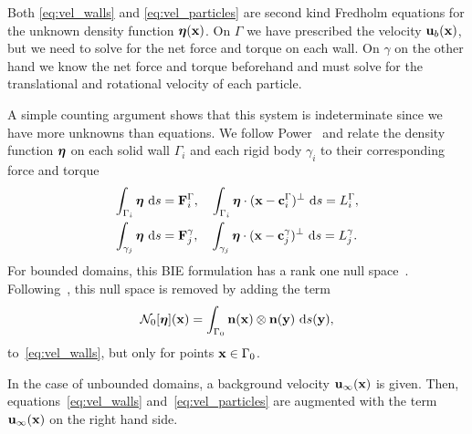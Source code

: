 \documentclass[preprint, 10pt]{elsarticle}
\begin{document}
Both \eqref{eq:vel_walls} and \eqref{eq:vel_particles} are second kind Fredholm equations for the unknown density function ${\boldsymbol\eta}({\mathbf{x}})$. On $\Gamma$ we have prescribed the velocity ${\mathbf{u}}_b({\mathbf{x}})$, but we need to solve for the net force and torque on each wall. On $\gamma$ on the other hand we know the net force and torque beforehand and must solve for the translational and rotational velocity of each particle. 

A simple counting argument shows that this system is indeterminate since we have more unknowns than equations. We follow Power~\cite{Power1993} and
relate the density function ${\boldsymbol\eta}$ on each solid wall $\Gamma_i$ and
each rigid body $\gamma_i$ to their corresponding force and torque
\begin{equation}
  \label{eq:closure}
  \begin{aligned}
    \int_{\Gamma_i} {\boldsymbol\eta}~\text{d}s &= {\mathbf{F}}^\Gamma_i, \quad
    \int_{\Gamma_i} {\boldsymbol\eta}\cdot ({\mathbf{x}} - {\mathbf{c}}^\Gamma_i)^\perp~\text{d}s = L^\Gamma_i, \\
    \int_{\gamma_j} {\boldsymbol\eta}~\text{d}s &= {\mathbf{F}}^\gamma_j, \quad
    \int_{\gamma_j} {\boldsymbol\eta}\cdot ({\mathbf{x}} - {\mathbf{c}}^\gamma_j)^\perp~\text{d}s = L^\gamma_j.
  \end{aligned}
\end{equation}
For bounded domains, this BIE
formulation has a rank one null space~\cite{Ladyzhenskaya1963}.
Following~\cite{Power1993}, this null space is removed by adding the
term
\begin{align}
  \label{eq:N0_modification}
  \mathcal{N}_0[{\boldsymbol\eta}]({\mathbf{x}}) = \int_{\Gamma_0}
  {\mathbf{n}}({\mathbf{x}})\otimes{\mathbf{n}}({\mathbf{y}})~\text{d}s(\mathbf{y}),
\end{align}
to~\eqref{eq:vel_walls}, but only for points ${\mathbf{x}} \in \Gamma_0$.

In the case of unbounded domains, a background velocity
${\mathbf{u}}_\infty({\mathbf{x}})$ is given.  Then, equations~\eqref{eq:vel_walls}
and~\eqref{eq:vel_particles} are augmented with the term
${\mathbf{u}}_\infty({\mathbf{x}})$ on the right hand side. 
\end{document}
